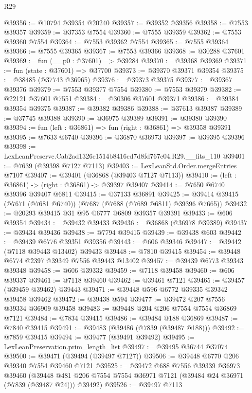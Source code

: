 \begin{lexlean}{R29}
\begin{coremodule}
@39356 := @10794 @39354 @20240
@39357 := @39352 @39356
@39358 := @7553 @39357
@39359 := @37353 @7554
@39360 := @7555 @39359
@39362 := @7553 @39360 @7554
@39364 := @7553 @39362 @7554
@39365 := @7555 @39364
@39366 := @7555 @39365
@39367 := @7553 @39366
@39368 := @30288 @37601
@39369 := fun (__p0 : @37601) => @39284
@39370 := @39368 @39369
@39371 := fun (state : @37601) => @37700
@39373 := @39370 @39371 @39354
@39375 := @38485 (@37743 @36965)
@39376 := @39373 @39375
@39377 := @39367 @39376
@39379 := @7553 @39377 @7554
@39380 := @7553 @39379
@39382 := @22121 @37601 @7551
@39384 := @30306 @37601 @39371
@39386 := @39384 @39354 @39375
@39387 := @39382 @39386
@39388 := @37613 @39387
@39389 := @37745 @39388
@39390 := @36975 @39389
@39391 := @39380 @39390
@39394 := fun (left : @36861) => fun (right : @36861) => @39358 @39391
@39395 := @7633 @6740
@39396 := @36870 @36973
@39397 := @39395 @39396
@39398 := LexLeanPreserve.Cab2ad1326c1514b8416cd7d8fd767c04.R29.__fits_110
@39401 := @7639 (@39398 @7127 @7113)
@39403 := LexLeanStd.Order.mergeEntries @7107
@39407 := @39401 (@36868 (@39403 @7127 @7113))
@39410 := (left : @36861) -> (right : @36861) -> @39397 @39407
@39414 := @7650 @6740 @39396 @39407 @6811
@39415 := @37133 @36891
@39425 := @39414 @39415 (@7671 (@7681 @6740)) (@7687 (@7688 (@7689 @6811) @39396 @7665))
@39432 := @20293 @39415 @31 @95 @6777 @6809 @39357 @39391
@39433 := @606 @39354
@39434 := @39432 @39433
@39436 := @36868 (@36978 @39389)
@39437 := @39434 @39436
@39438 := @7794 @39415
@39439 := @39438 @603
@39442 := @39439 @6776 @39351 @39356
@39443 := @606 @39346
@39447 := @39442 (@7118 @39443 @13402) @39433
@39448 := @7810 @39415
@39454 := @39448 @6774 @2397 @39349 @7556 @39443 @13402
@39457 := @39439 @6773 @39343 @39348
@39458 := @606 @39332
@39459 := @7118 @39458
@39460 := @606 @39337
@39461 := @7118 @39460
@39462 := @39461 @7121
@39465 := @39457 (@39459 @39462) @39443
@39471 := @39448 @596 @6772 @39335 @39342 @39458 @39462
@39472 := @39438 @594
@39477 := @39472 @207 @7556 @39334 @36909 @39458
@39483 := @39448 @204 @206 @7554 @7554 @36869 @7121
@39484 := @7834 @39415
@39486 := @39484 @188 @36869
@39487 := @7840 @39415
@39491 := @39483 (@39486 (@7839 (@39487 @188)))
@39492 := @7859 @39415
@39494 := @39477 (@39491 @39492)
@39495 := LexLeanPreservation.prim_length_list
@39497 := @39495 @36744 @37074
@39500 := @39471 (@39494 (@39497 @7127))
@39506 := @39448 @6770 @206 @39340 @7554 @39460 @7121
@39525 := @39472
    @688
    @7556
    @39339
    @36973
    @39460
    (@39448 @481 @206 @7554 @7554 @36971 @7121 (@39484 @24 @36971 (@7839 (@39487 @24))) @39492)
@39526 := @39497 @7113

\end{coremodule}
\end{lexlean}
